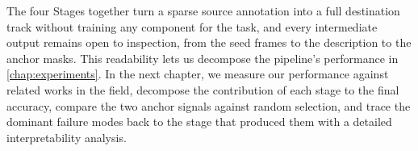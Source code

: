 \vspace{4mm}
The four Stages together turn a sparse source annotation into a full destination track without training any component for the task, and every intermediate output remains open to inspection, from the seed frames to the description to the anchor masks. This readability lets us decompose the pipeline's performance in \cref{chap:experiments}. In the next chapter, we measure our performance against related works in the field, decompose the contribution of each stage to the final accuracy, compare the two anchor signals against random selection, and trace the dominant failure modes back to the stage that produced them with a detailed interpretability analysis. 